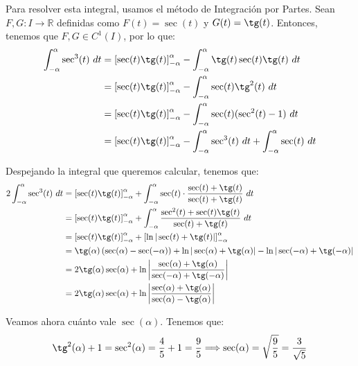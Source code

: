 \begin{ejercicio}
\begin{enumerate}
\begin{description}
            Para resolver esta integral, usamos el método de Integración por Partes.
            Sean $F,G:I\to\mathbb{R}$ definidas como $F(t)=\sec(t)$ y $G(t)=\tg(t)$. Entonces, tenemos que $F,G\in C^1(I)$, por lo que:
            \begin{align*}
                \int_{-\alpha}^{\alpha} \sec^3(t)~dt
                &= \left[ \sec(t)\tg(t) \right]_{-\alpha}^{\alpha} - \int_{-\alpha}^{\alpha} \tg(t)\sec(t)\tg(t)~dt \\
                &= \left[ \sec(t)\tg(t) \right]_{-\alpha}^{\alpha} - \int_{-\alpha}^{\alpha} \sec(t)\tg^2(t)~dt \\
                &= \left[ \sec(t)\tg(t) \right]_{-\alpha}^{\alpha} - \int_{-\alpha}^{\alpha} \sec(t)(\sec^2(t)-1)~dt \\
                &= \left[ \sec(t)\tg(t) \right]_{-\alpha}^{\alpha} - \int_{-\alpha}^{\alpha} \sec^3(t)~dt + \int_{-\alpha}^{\alpha} \sec(t)~dt
            \end{align*}

            Despejando la integral que queremos calcular, tenemos que:
            \begin{align*}
                2\int_{-\alpha}^{\alpha} \sec^3(t)~dt
                &= \left[ \sec(t)\tg(t) \right]_{-\alpha}^{\alpha} + \int_{-\alpha}^{\alpha} \sec(t)\cdot \frac{\sec(t)+\tg(t)}{\sec(t)+\tg(t)}~dt \\
                &= \left[ \sec(t)\tg(t) \right]_{-\alpha}^{\alpha} + \int_{-\alpha}^{\alpha} \frac{\sec^2(t)+\sec(t)\tg(t)}{\sec(t)+\tg(t)}~dt \\
                &= \left[ \sec(t)\tg(t) \right]_{-\alpha}^{\alpha} + \left[ \ln|\sec(t)+\tg(t)| \right]_{-\alpha}^{\alpha} \\
                &= \tg(\alpha) \left(\sec(\alpha)-\sec(-\alpha)\right) + \ln|\sec(\alpha)+\tg(\alpha)| - \ln|\sec(-\alpha)+\tg(-\alpha)| \\
                &= 2\tg(\alpha)\sec(\alpha) + \ln\left|\dfrac{\sec(\alpha)+\tg(\alpha)}{\sec(-\alpha)+\tg(-\alpha)}\right| \\
                &= 2\tg(\alpha)\sec(\alpha) + \ln\left|\dfrac{\sec(\alpha)+\tg(\alpha)}{\sec(\alpha)-\tg(\alpha)}\right| \\
            \end{align*}

            Veamos ahora cuánto vale $\sec(\alpha)$. Tenemos que:
            \begin{equation*}
                \tg^2(\alpha) + 1 = \sec^2(\alpha) = \frac{4}{5} + 1 = \frac{9}{5}
                \Longrightarrow \sec(\alpha) = \sqrt{\frac{9}{5}} = \frac{3}{\sqrt{5}}
            \end{equation*}
            

\end{description}
\end{enumerate}
\end{ejercicio}
